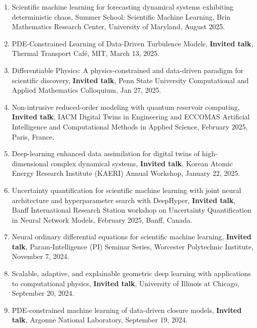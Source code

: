 \documentclass[letterpaper]{article}
\begin{document}
\begin{enumerate}

\item Scientific machine learning for forecasting dynamical systems exhibiting deterministic chaos, Summer School: Scientific Machine Learning, Brin Mathematics Research Center, University of Maryland, August 2025.

\item PDE-Constrained Learning of Data-Driven Turbulence Models, \textbf{Invited talk}, Thermal Transport Caf\'{e}, MIT, March 13, 2025.

\item Differentiable Physics: A physics-constrained and data-driven paradigm for scientific discovery, \textbf{Invited talk}, Penn State University Computational and Applied Mathematics Colloquium, Jan 27, 2025.

\item Non-intrusive reduced-order modeling with quantum reservoir computing, \textbf{Invited talk}, IACM Digital Twins in Engineering and ECCOMAS Artificial Intelligence and Computational Methods in Applied Science, February 2025, Paris, France.

\item Deep-learning enhanced data assimilation for digital twins of high-dimensional complex dynamical systems, \textbf{Invited talk}, Korean Atomic Energy Research Institute (KAERI) Annual Workshop, January 22, 2025.

\item Uncertainty quantification for scientific machine learning with joint neural architecture and hyperparameter search with DeepHyper, \textbf{Invited talk}, Banff International Research Station workshop on Uncertainty Quantification in Neural Network Models, February 2025, Banff, Canada.

\item Neural ordinary differential equations for scientific machine learning, \textbf{Invited talk}, Param-Intelligence (PI) Seminar Series, Worcester Polytechnic Institute, November 7, 2024.

\item Scalable, adaptive, and explainable geometric deep learning with applications to computational physics, \textbf{Invited talk}, University of Illinois at Chicago, September 20, 2024.

\item PDE-constrained machine learning of data-driven closure models, \textbf{Invited talk}, Argonne National Laboratory, September 19, 2024.


\end{enumerate}
\end{document}
